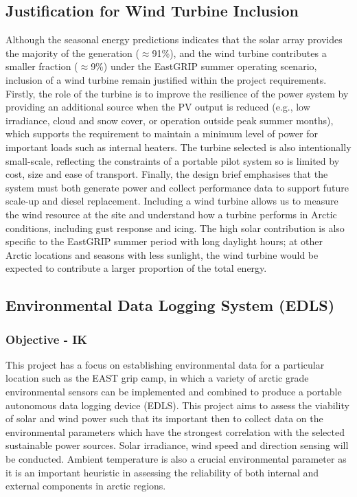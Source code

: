 \documentclass[11pt,a4paper]{article}
\begin{document}
\subsection{Justification for Wind Turbine Inclusion}
Although the seasonal energy predictions indicates that the solar array provides the majority of the generation ($\approx$91\%), and the wind turbine contributes a smaller fraction ($\approx$9\%) under the EastGRIP summer operating scenario, inclusion of a wind turbine remain justified within the project requirements. Firstly, the role of the turbine is to improve the resilience of the power system by providing an additional source when the PV output is reduced (e.g., low irradiance, cloud and snow cover, or operation outside peak summer months), which supports the requirement to maintain a minimum level of power for important loads such as internal heaters. The turbine selected is also intentionally small-scale, reflecting the constraints of a portable pilot system so is limited by cost, size and ease of transport. Finally, the design brief emphasises that the system must both generate power and collect performance data to support future scale-up and diesel replacement. Including a wind turbine allows us to measure the wind resource at the site and understand how a turbine performs in Arctic conditions, including gust response and icing. The high solar contribution is also specific to the EastGRIP summer period with long daylight hours; at other Arctic locations and seasons with less sunlight, the wind turbine would be expected to contribute a larger proportion of the total energy.

\subsection{Environmental Data Logging System (EDLS)}

\subsubsection{Objective - IK}
This project has a focus on establishing environmental data for a particular location such as the EAST grip camp, in which a variety of arctic grade environmental sensors can be implemented and combined to produce a portable autonomous data logging device (EDLS). This project aims to assess the viability of solar and wind power such that its important then to collect data on the environmental parameters which have the strongest correlation with the selected sustainable power sources. Solar irradiance, wind speed and direction sensing will be conducted. Ambient temperature is also a crucial environmental parameter as it is an important heuristic in assessing the reliability of both internal and external components in arctic regions. 
\end{document}
